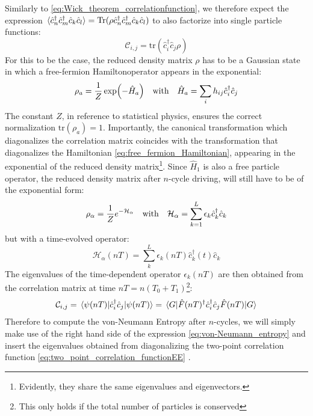\documentclass[11pt, a4paper, oneside]{book}
\theoremstyle{definition} %
\begin{document}
Similarly to \ref{eq:Wick_theorem_correlationfunction}, we therefore expect the expression $\expval*{ \hat{c}_n^\dagger \hat{c}_m^\dagger \hat{c}_k \hat{c}_l}= \text{Tr}(\rho \hat{c}_n^\dagger \hat{c}_m^\dagger \hat{c}_k \hat{c}_l)$ to also factorize into single particle functions:
	\begin{equation}
		\mathcal{C}_{i,j} = \text{tr}(\hat{c}_i^\dagger \hat{c}_j \rho)
	\end{equation}
	For this to be the case, the reduced density matrix $\rho$ has to be a Gaussian state in which a free-fermion Hamiltonoperator appears in the exponential:
	\begin{equation}
		\rho_a = \frac{1}{Z} \exp(- \hat{H}_a) \qq{with} \hat{H}_a = \sum_i h_{ij} \hat{c}_i^\dagger \hat{c}_j
		\label{eq:reduced_density_matrix}
	\end{equation}
	The constant $Z$, in reference to statistical physics, ensures the correct normalization $\text{tr}(\rho_a) = 1$. Importantly, the canonical transformation which diagonalizes the correlation matrix coincides with the transformation that diagonalizes the Hamiltonian \ref{eq:free_fermion_Hamiltonian}, appearing in the exponential of the reduced density matrix\footnote{Evidently, they share the same eigenvalues and eigenvectors.}. Since $\hat{H}_1$ is also a free particle operator, the reduced density matrix after $n$-cycle driving, will still have to be of the exponential form:
	\begin{equation}
		\rho_\alpha = \frac{1}{Z} e^{-\mathcal{H}_\alpha} \qq{with} \mathcal{H}_\alpha = \sum_{k=1}^L \epsilon_k \hat{c}_k^\dagger \hat{c}_k
	\end{equation}
	but with a time-evolved operator:
	\begin{equation}
		\mathcal{H}_\alpha(nT) = \sum_{k}^L \epsilon_k(nT) \hat{c}_k^\dagger(t) \hat{c}_k
	\end{equation}
	The eigenvalues of the time-dependent operator $\epsilon_k(nT)$ are then obtained from the correlation matrix at time $nT = n(T_0 + T_1)$\footnote{This only holds if the total number of particles is conserved}:
\begin{equation}
		\mathcal{C}_{i,j} = \mel{\psi(nT)}{\hat{c}_i^\dagger \hat{c}_j}{\psi(nT)} = \mel{G}{\hat{F}(nT)^\dagger \hat{c}_i^\dagger \hat{c}_j\hat{F}(nT)}{G}
		\label{eq:two_point_correlation_functionEE}
\end{equation}
Therefore to compute the von-Neumann Entropy after $n$-cycles,  we will simply make use of the right hand side of the expression \ref{eq:von-Neumann_entropy} and insert the eigenvalues obtained from diagonalizing the two-point correlation function \ref{eq:two_point_correlation_functionEE} \cite{Peschel2, Peschel_Ingo-Calculation_of_reduced_density_matrices_from_correlation_functions,Peschel_Ingo-Reduced_density_matrices_and_entanglement_entropy_in_free_lattice_models}.
	
\end{document}
